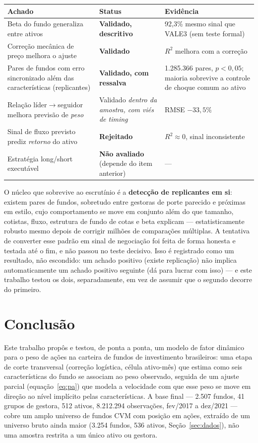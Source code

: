 \documentclass[11pt,a4paper]{article}
\begin{document}
\begin{table}[h]\centering\small
\begin{tabular}{@{}p{5.6cm}p{2.6cm}p{5.4cm}@{}}
\toprule
Achado & Status & Evidência \\
\midrule
Beta do fundo generaliza entre ativos & \textbf{Validado, descritivo} & 92,3\% mesmo sinal que VALE3 (sem teste formal) \\
Correção mecânica de preço melhora o ajuste & \textbf{Validado} & $R^2$ melhora com a correção \\
Pares de fundos com erro sincronizado além das características (replicantes) & \textbf{Validado, com ressalva} & 1.285.366 pares, $p<0{,}05$; maioria sobrevive a controle de choque comum ao ativo \\
Relação líder$\to$seguidor melhora previsão de \emph{peso} & Validado \emph{dentro da amostra, com viés de timing} & RMSE $-33{,}5\%$ \\
Sinal de fluxo previsto prediz \emph{retorno} do ativo & \textbf{Rejeitado} & $R^2\approx0$, sinal inconsistente \\
Estratégia long/short executável & \textbf{Não avaliado} (depende do item anterior) & --- \\
\bottomrule
\end{tabular}
\end{table}

O núcleo que sobrevive ao escrutínio é a \textbf{detecção de replicantes em si}: existem pares
de fundos, sobretudo entre gestoras de porte parecido e próximas em estilo, cujo comportamento
se move em conjunto além do que tamanho, cotistas, fluxo, estrutura de fundo de cotas e beta
explicam --- estatisticamente robusto mesmo depois de corrigir milhões de comparações
múltiplas. A tentativa de converter esse padrão em sinal de negociação foi feita de forma
honesta e testada até o fim, e não passou no teste decisivo. Isso é registrado como um
resultado, não escondido: um achado positivo (existe replicação) não implica automaticamente um
achado positivo seguinte (dá para lucrar com isso) --- e este trabalho testou os dois,
separadamente, em vez de assumir que o segundo decorre do primeiro.

\FloatBarrier
\section{Conclusão}
\label{sec:conclusao}

Este trabalho propôs e testou, de ponta a ponta, um modelo de fator dinâmico para o peso de
ações na carteira de fundos de investimento brasileiros: uma etapa de corte transversal
(correção logística, célula ativo-mês) que estima como seis características do fundo se associam
ao peso observado, seguida de um ajuste parcial (equação~\eqref{eq:pa}) que modela a velocidade
com que esse peso se move em direção ao nível implícito pelas características. A base final ---
2.507 fundos, 41 grupos de gestora, 512 ativos, 8.212.294 observações, fev/2017 a dez/2021 ---
cobre um amplo universo de fundos CVM com posição em ações, extraído de um universo bruto ainda
maior (3.254 fundos, 536 ativos, Seção~\ref{sec:dados}), não uma amostra restrita a um único
ativo ou gestora.
\end{document}
